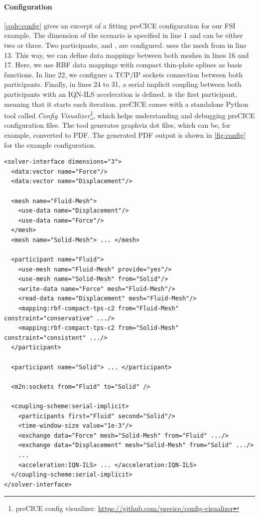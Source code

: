 \paragraph{Configuration} \autoref{code:config} gives an excerpt of a fitting preCICE configuration for our FSI example. The dimension of the scenario is specified in line 1 and can be either two or three. Two participants,  and , are configured.  uses the mesh from  in line 13. This way, we can define data mappings between both meshes in lines 16 and 17. Here, we use RBF data mappings with compact thin-plate splines as basis functions. In line 22, we configure a TCP/IP sockets connection between both participants. Finally, in lines 24 to 31, a serial implicit coupling between both participants with an IQN-ILS acceleration is defined.  is the first participant, meaning that it starts each iteration. preCICE comes with a standalone Python tool called \textit{Config Visualizer}\footnote{preCICE config visualizer: \url{https://github.com/precice/config-visualizer}}, which helps understanding and debugging preCICE configuration files. The tool generates graphviz dot files\cite{Ellson03graphviz}, which can be, for example, converted to PDF. The generated PDF output is shown in \autoref{fig:config} for the example configuration.

\begin{listing}[h!]
\caption{Excerpt of a preCICE configuration file. Two participants  and  are coupled.}
\small
\label{code:config}
\begin{verbatim}
<solver-interface dimensions="3">   
  <data:vector name="Force"/>
  <data:vector name="Displacement"/> 
 
  <mesh name="Fluid-Mesh">
    <use-data name="Displacement"/>
    <use-data name="Force"/>
  </mesh>
  <mesh name="Solid-Mesh"> ... </mesh>

  <participant name="Fluid">
    <use-mesh name="Fluid-Mesh" provide="yes"/>
    <use-mesh name="Solid-Mesh" from="Solid"/>
    <write-data name="Force" mesh="Fluid-Mesh"/>
    <read-data name="Displacement" mesh="Fluid-Mesh"/>
    <mapping:rbf-compact-tps-c2 from="Fluid-Mesh" constraint="conservative" .../>
    <mapping:rbf-compact-tps-c2 from="Solid-Mesh" constraint="consistent" .../>
  </participant>
    
  <participant name="Solid"> ... </participant>
    
  <m2n:sockets from="Fluid" to="Solid" />
    
  <coupling-scheme:serial-implicit>
    <participants first="Fluid" second="Solid"/>
    <time-window-size value="1e-3"/> 
    <exchange data="Force" mesh="Solid-Mesh" from="Fluid" .../> 
    <exchange data="Displacement" mesh="Solid-Mesh" from="Solid" .../>
    ...
    <acceleration:IQN-ILS> ... </acceleration:IQN-ILS>
  </coupling-scheme:serial-implicit>
</solver-interface>
\end{verbatim}
\end{listing}


